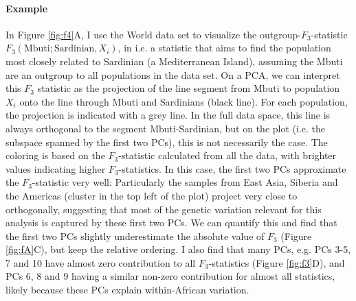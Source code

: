 \documentclass[12pt,fullpage, a4paper]{article}
\begin{document}
 
 




\paragraph{Example}
In Figure \ref{fig:f4}A, I use the World data set to visualize the outgroup-$F_3$-statistic $F_3(\text{Mbuti}; \text{Sardinian}, X_i)$, in i.e. a statistic that aims to find the population most closely related to Sardinian (a Mediterranean Island), assuming the Mbuti are an outgroup to all populations in the data set. On a PCA, we can interpret this $F_3$ statistic as the projection of the line segment from $\text{Mbuti}$ to population $X_i$ onto the line through Mbuti and Sardinians (black line). For each population, the projection is indicated with a grey line. In the full data space, this line is always orthogonal to the segment Mbuti-Sardinian, but on the plot (i.e. the subspace spanned by the first two PCs), this is not necessarily the case.  The coloring is based on the $F_3$-statistic calculated from all the data, with brighter values indicating higher $F_3$-statistics. In this case, the first two PCs approximate the $F_3$-statistic very well: Particularly the samples from East Asia, Siberia and the Americas (cluster in the top left of the plot) project very close to orthogonally, suggesting that most of the genetic variation relevant for this analysis is captured by these first two PCs.  We can quantify this and find that the first two PCs slightly underestimate the absolute value of $F_3$ (Figure \ref{fig:fA}C), but keep the relative ordering. I also find that many PCs, e.g. PCs 3-5, 7 and 10 have almost zero contribution to all $F_3$-statistics (Figure \ref{fig:f3}D), and PCs 6, 8 and 9 having a similar non-zero contribution for almost all statistics, likely because these PCs explain within-African variation.
\end{document}
